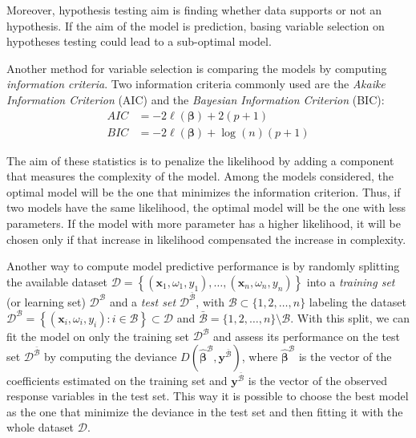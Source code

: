 \documentclass[a4paper, nobind]{templates/ociamthesis}
\theoremstyle{definition}
\theoremstyle{definition}
\theoremstyle{definition}
\theoremstyle{remark}
\begin{document}
Moreover, hypothesis testing aim is finding whether data supports or not an hypothesis. If the aim of the model is prediction, basing variable selection on hypotheses testing could lead to a sub-optimal model.

Another method for variable selection is comparing the models by computing \emph{information criteria}. Two information criteria commonly used are the \emph{Akaike Information Criterion} (AIC) and the \emph{Bayesian Information Criterion} (BIC):
\begin{align*}
AIC & = -2\ell(\boldsymbol{\beta}) + 2 (p+1) \\
BIC & = -2\ell(\boldsymbol{\beta}) + \log(n) (p+1)
\end{align*}

The aim of these statistics is to penalize the likelihood by adding a component that measures the complexity of the model. Among the models considered, the optimal model will be the one that minimizes the information criterion. Thus, if two models have the same likelihood, the optimal model will be the one with less parameters. If the model with more parameter has a higher likelihood, it will be chosen only if that increase in likelihood compensated the increase in complexity.

Another way to compute model predictive performance is by randomly splitting the available dataset \(\mathcal{D} = \left\{ (\boldsymbol{x}_1, \omega_1, y_1), \dots, (\boldsymbol{x}_n, \omega_n, y_n) \right\}\) into a \emph{training set} (or learning set) \(\mathcal{D}^{\mathcal{B}}\) and a \emph{test set} \(\mathcal{D}^{\bar{\mathcal{B}}}\), with \(\mathcal{B}\subset\{1,2,\dots,n\}\) labeling the dataset \(\mathcal{D}^{\mathcal{B}} = \left\{ (\boldsymbol{x}_i, \omega_i, y_i): i \in \mathcal{B} \right\} \subset \mathcal{D}\) and \(\bar{\mathcal{B}} = \{1, 2, \dots, n\} \setminus \mathcal{B}\). With this split, we can fit the model on only the training set \(\mathcal{D}^{\mathcal{B}}\) and assess its performance on the test set \(\mathcal{D}^{\bar{\mathcal{B}}}\) by computing the deviance \(D\left( \hat{\boldsymbol{\beta}}^{\mathcal{B}}, \boldsymbol{y}^{\bar{\mathcal{B}}} \right)\), where \(\hat{\boldsymbol{\beta}}^{\mathcal{B}}\) is the vector of the coefficients estimated on the training set and \(\boldsymbol{y}^{\bar{\mathcal{B}}}\) is the vector of the observed response variables in the test set. This way it is possible to choose the best model as the one that minimize the deviance in the test set and then fitting it with the whole dataset \(\mathcal{D}\).
\end{document}
